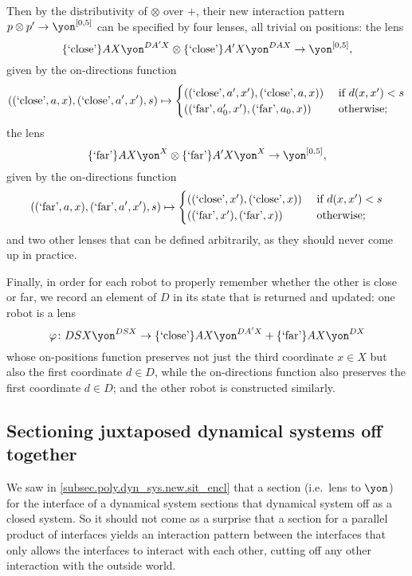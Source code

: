 \documentclass[Book-Poly]{subfiles}
\begin{document}
\begin{exercise}
\begin{solution}
\begin{enumerate}
    Then by the distributivity of $\otimes$ over $+$, their new interaction pattern $p\otimes p'\to\yon^{[0,5]}$ can be specified by four lenses, all trivial on positions: the lens
    \[
        \{\text{`close'}\}AX\yon^{DA'X}\otimes\{\text{`close'}\}A'X\yon^{DAX}\to\yon^{[0,5]},
    \]
    given by the on-directions function
    \[
        ((\text{`close'},a,x),(\text{`close'},a',x'),s)\mapsto
          \begin{cases}
          	((\text{`close'},a',x'),(\text{`close'},a,x))&\textnormal{ if }d(x,x')<s\\
          	((\text{`far'},a'_0,x'),(\text{`far'},a_0,x))&\textnormal{ otherwise};
          \end{cases}
    \]
    the lens
    \[
        \{\text{`far'}\}AX\yon^X\otimes\{\text{`far'}\}A'X\yon^X\to\yon^{[0,5]},
    \]
    given by the on-directions function
    \[
        ((\text{`far'},a,x),(\text{`far'},a',x'),s)\mapsto
          \begin{cases}
          	((\text{`close'},x'),(\text{`close'},x))&\textnormal{ if }d(x,x')<s\\
          	((\text{`far'},x'),(\text{`far'},x))&\textnormal{ otherwise};
          \end{cases}
    \]
    and two other lenses that can be defined arbitrarily, as they should never come up in practice.

    Finally, in order for each robot to properly remember whether the other is close or far, we record an element of $D$ in its state that is returned and updated: one robot is a lens
    \[
        \varphi\colon DSX\yon^{DSX}\to \{\text{`close'}\}AX\yon^{DA'X}+\{\text{`far'}\}AX\yon^{DX}
    \]
    whose on-positions function preserves not just the third coordinate $x\in X$ but also the first coordinate $d\in D$, while the on-directions function also preserves the first coordinate $d\in D$; and the other robot is constructed similarly.
\end{enumerate}
\end{solution}
\end{exercise}


\subsection{Sectioning juxtaposed dynamical systems off together}

We saw in \cref{subsec.poly.dyn_sys.new.sit_encl} that a section (i.e.\ lens to $\yon$) for the interface of a dynamical system sections that dynamical system off as a closed system.
So it should not come as a surprise that a section for a parallel product of interfaces yields an interaction pattern between the interfaces that only allows the interfaces to interact with each other, cutting off any other interaction with the outside world.
\end{document}
